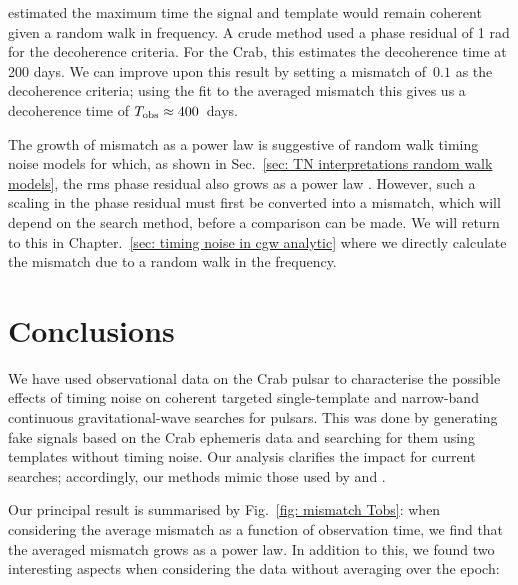 \documentclass[../full_thesis/full_thesis.tex]{subfiles}
\begin{document}
\citet{Jones2004} estimated the maximum time the signal and template would
remain coherent given a random walk in  frequency. A crude method used a
phase residual of 1 rad for the decoherence criteria. For the Crab, this
estimates the decoherence time at 200 days. We can improve upon this result by
setting a mismatch of~$0.1$ as the decoherence criteria; using the fit to the
averaged mismatch this gives us a decoherence time of $T_{\textrm{obs}}\approx 400 $~days.

The growth of mismatch as a power law is suggestive of random walk timing noise
models for which, as shown in Sec.~\ref{sec: TN interpretations random walk
models}, the rms phase residual also grows as a power law \citep{Boynton1972, Cordes1981}.
However, such a scaling in the phase residual must first be converted into a
mismatch, which will depend on the search method, before a comparison can be
made. We will return to this in Chapter.~\ref{sec: timing noise in cgw
analytic} where we directly calculate the mismatch due to a random walk in
the frequency.


\section{Conclusions}
\label{sec: narrow-band conclusions}
We have used observational data on the Crab pulsar to characterise the possible
effects of timing noise on coherent targeted single-template  and narrow-band
continuous gravitational-wave searches for pulsars.  This was done by generating fake
signals based on the Crab ephemeris data and searching for them using templates
without timing noise. Our analysis clarifies the impact for current searches;
accordingly, our methods mimic those used by \citet{ligo2008} and \citet{ligo2015}.

Our principal result is summarised by Fig.~\ref{fig: mismatch Tobs}:
when considering the average mismatch as
a function of observation time,  we find that the averaged
mismatch grows as a power law. In addition to this, we found two interesting
aspects when considering the data without averaging over the epoch:
\end{document}
